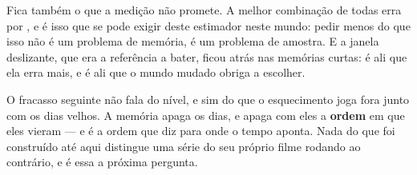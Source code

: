 Fica também o que a medição não promete. A melhor combinação de todas erra por
\numEsquecimentoMelhor{}, e é isso que se pode exigir deste estimador neste mundo: pedir menos do que
isso não é um problema de memória, é um problema de amostra. E a janela deslizante, que era a
referência a bater, ficou atrás nas memórias curtas: é ali que ela erra mais, e é ali que o mundo
mudado obriga a escolher.

O fracasso seguinte não fala do nível, e sim do que o esquecimento joga fora junto com os dias velhos.
A memória apaga os dias, e apaga com eles a \textbf{ordem} em que eles vieram --- e é a ordem que diz para
onde o tempo aponta. Nada do que foi construído até aqui distingue uma série do seu próprio filme
rodando ao contrário, e é essa a próxima pergunta.

